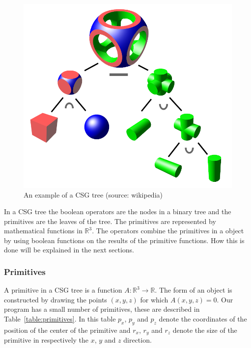 \documentclass[a4paper,10pt,twocolumn]{article}
\begin{document}
    \begin{figure}[h]
        \begin{center}
            \includegraphics[scale=.2]{./images/csgtree.png}
        \end{center}
        \caption{An example of a CSG tree (source: wikipedia\cite{img:wiki_csg_tree})}
        \label{figure:csg_tree}
    \end{figure}

    In a CSG tree the boolean operators are the nodes in a binary tree and the primitives are the leaves of the tree. The primitives are represented by mathematical functions in $\mathbb{R}^3$. The operators combine the primitives in a object by using boolean functions on the results of the primitive functions. How this is done will be explained in the next sections.

\subsubsection{Primitives}
    A primitive in a CSG tree is a function $A:\mathbb{R}^3 \rightarrow \mathbb{R}$. The form of an object is constructed by drawing the points $(x,y,z)$ for which $A(x,y,z)=0$. Our program has a small number of primitives, these are described in Table~\ref{table:primitives}. In this table $p_x$, $p_y$ and $p_z$ denote the coordinates of the position of the center of the primitive and $r_x$, $r_y$ and $r_z$ denote the size of the primitive in respectively the $x$, $y$ and $z$ direction.
\end{document}
